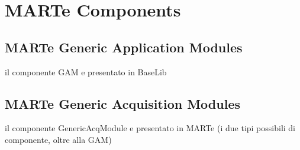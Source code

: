\chapter{MARTe Components}



\section{MARTe Generic Application Modules}



il componente GAM e presentato in BaseLib






\section{MARTe Generic Acquisition Modules}


il componente GenericAcqModule e presentato in MARTe
(i due tipi possibili di componente, oltre alla GAM)